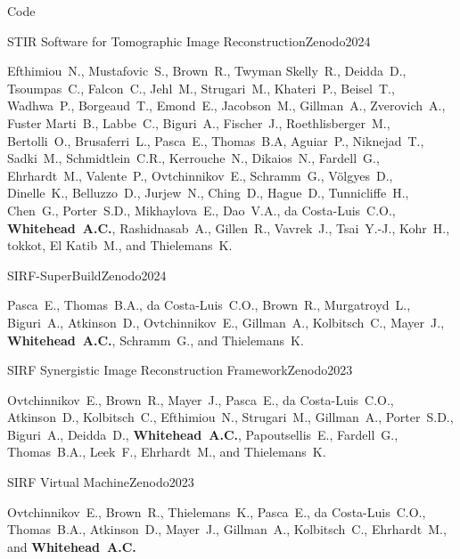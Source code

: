 \documentclass{cv}
\begin{document}
\begin{spacing}{1.0}
        \begin{rSection}{Code}
            \item \begin{rSubsection}{STIR Software for Tomographic Image Reconstruction}{}{Zenodo}{2024}
                \item Efthimiou~N., Mustafovic~S., Brown~R., Twyman Skelly~R., Deidda~D., Tsoumpas~C., Falcon~C., Jehl~M., Strugari~M., Khateri~P., Beisel~T., Wadhwa~P., Borgeaud~T., Emond~E., Jacobson~M., Gillman~A., Zverovich~A., Fuster Marti~B., Labbe~C., Biguri~A., Fischer~J., Roethlisberger~M., Bertolli~O., Brusaferri~L., Pasca~E., Thomas~B.A, Aguiar~P., Niknejad~T., Sadki~M., Schmidtlein~C.R., Kerrouche~N., Dikaios~N., Fardell~G., Ehrhardt~M., Valente~P., Ovtchinnikov~E., Schramm~G., Völgyes~D., Dinelle~K., Belluzzo~D., Jurjew~N., Ching~D., Hague~D., Tunnicliffe~H., Chen~G., Porter~S.D., Mikhaylova~E., Dao~V.A., da Costa-Luis~C.O., \textbf{Whitehead~A.C.}, Rashidnasab~A., Gillen~R., Vavrek~J., Tsai~Y.-J., Kohr~H., tokkot, El Katib~M., and Thielemans~K.
            \end{rSubsection}

            \item \begin{rSubsection}{SIRF-SuperBuild}{}{Zenodo}{2024}
                \item Pasca~E., Thomas~B.A., da Costa-Luis~C.O., Brown~R., Murgatroyd~L., Biguri~A., Atkinson~D., Ovtchinnikov~E., Gillman~A., Kolbitsch~C., Mayer~J., \textbf{Whitehead~A.C.}, Schramm~G., and Thielemans~K.
            \end{rSubsection}
            
            \item \begin{rSubsection}{SIRF Synergistic Image Reconstruction Framework}{}{Zenodo}{2023}
                \item Ovtchinnikov~E., Brown~R., Mayer~J., Pasca~E., da Costa-Luis~C.O., Atkinson~D., Kolbitsch~C., Efthimiou~N., Strugari~M., Gillman~A., Porter~S.D., Biguri~A., Deidda~D., \textbf{Whitehead~A.C.}, Papoutsellis~E., Fardell~G., Thomas~B.A., Leek~F., Ehrhardt~M., and Thielemans~K.
            \end{rSubsection}
            
            \item \begin{rSubsection}{SIRF Virtual Machine}{}{Zenodo}{2023}
                \item Ovtchinnikov~E., Brown~R., Thielemans~K., Pasca~E., da Costa-Luis~C.O., Thomas~B.A., Atkinson~D., Mayer~J., Gillman~A., Kolbitsch~C., Ehrhardt~M., and \textbf{Whitehead~A.C.}
            \end{rSubsection}
        \end{rSection}
    \end{spacing}
\end{document}

